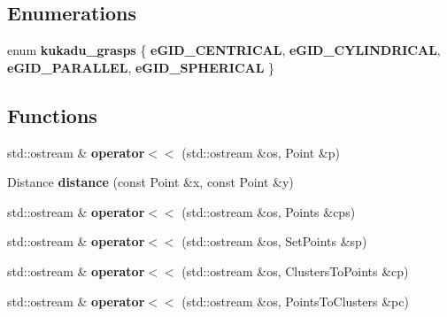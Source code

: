 \subsection*{Enumerations}
\begin{DoxyCompactItemize}
\item 
enum {\bfseries kukadu\-\_\-grasps} \{ {\bfseries e\-G\-I\-D\-\_\-\-C\-E\-N\-T\-R\-I\-C\-A\-L}, 
{\bfseries e\-G\-I\-D\-\_\-\-C\-Y\-L\-I\-N\-D\-R\-I\-C\-A\-L}, 
{\bfseries e\-G\-I\-D\-\_\-\-P\-A\-R\-A\-L\-L\-E\-L}, 
{\bfseries e\-G\-I\-D\-\_\-\-S\-P\-H\-E\-R\-I\-C\-A\-L}
 \}
\end{DoxyCompactItemize}
\subsection*{Functions}
\begin{DoxyCompactItemize}
\item 
\hypertarget{namespacekukadu_a9bfeb4f544ea51231d88a65026029571}{std\-::ostream \& {\bfseries operator$<$$<$} (std\-::ostream \&os, Point \&p)}\label{namespacekukadu_a9bfeb4f544ea51231d88a65026029571}

\item 
\hypertarget{namespacekukadu_ada1011866f0dc1fcb9a653bcd5f4816e}{Distance {\bfseries distance} (const Point \&x, const Point \&y)}\label{namespacekukadu_ada1011866f0dc1fcb9a653bcd5f4816e}

\item 
\hypertarget{namespacekukadu_aa57df45341cdd98a53fa18bc8b452c40}{std\-::ostream \& {\bfseries operator$<$$<$} (std\-::ostream \&os, Points \&cps)}\label{namespacekukadu_aa57df45341cdd98a53fa18bc8b452c40}

\item 
\hypertarget{namespacekukadu_a49d6376a2a2790e028fa8739c1caabd2}{std\-::ostream \& {\bfseries operator$<$$<$} (std\-::ostream \&os, Set\-Points \&sp)}\label{namespacekukadu_a49d6376a2a2790e028fa8739c1caabd2}

\item 
\hypertarget{namespacekukadu_a6e0b1341a7de4c204d43c329bb253fa9}{std\-::ostream \& {\bfseries operator$<$$<$} (std\-::ostream \&os, Clusters\-To\-Points \&cp)}\label{namespacekukadu_a6e0b1341a7de4c204d43c329bb253fa9}

\item 
\hypertarget{namespacekukadu_aa40e9cd0cd568cca2e6717fade91cec2}{std\-::ostream \& {\bfseries operator$<$$<$} (std\-::ostream \&os, Points\-To\-Clusters \&pc)}\label{namespacekukadu_aa40e9cd0cd568cca2e6717fade91cec2}


\end{DoxyCompactItemize}

